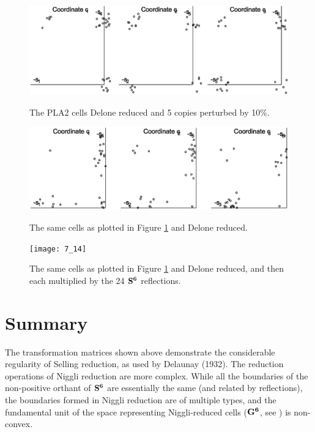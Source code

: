 \documentclass[]{iucr}              %
\numberwithin{equation}{section}
\newcommand{\SVI}[0]{$\bf{S^{6}}$}
\newcommand{\GVI}[0]{$\bf{G^{6}}$}
\begin{document}
	\begin{figure}
		\includegraphics[width=1.0\textwidth]{5_38}
		\label{5_38}
		\caption{The PLA2 cells Delone reduced and
		5 copies perturbed by 10\%.}
	\end{figure}
	
	\begin{figure}
		\includegraphics[width=1.0\textwidth]{6_53}
		\label{6_53}
		\caption{The same cells as plotted in Figure \ref{5_38} 
			and Delone reduced.}
	\end{figure}
	
\begin{figure}
	\texttt{[image: 7\_14]}
	\label{7_14}
		\caption{The same cells as plotted in Figure \ref{5_38} 
	and Delone reduced, and then each multiplied by the 24
	\SVI{} reflections.}
\end{figure}
	
	\section{Summary}
	
	The transformation matrices shown above demonstrate the 
	considerable regularity of Selling reduction, as used by 
	Delaunay (1932). The reduction operations of Niggli 
	reduction \cite{Niggli1928} are more complex. 
	While all the boundaries of the non-positive 
	orthant of \SVI{} are essentially the same (and 
	related by reflections), the boundaries formed in 
	Niggli reduction are of multiple types, and the fundamental unit 
	of the space representing Niggli-reduced cells (\GVI{}, see ) is non-convex.
	
\end{document}
